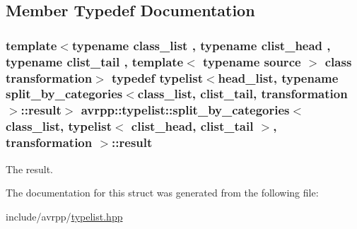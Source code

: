 \subsection{Member Typedef Documentation}
\hypertarget{structavrpp_1_1typelist_1_1split__by__categories_3_01class__list_00_01typelist_3_01clist__head_0fa46119bbacf04c898014ff4be749bde_a69ffa426e49eeba388aae05af3c33b9b}{
\subsubsection[{result}]{\setlength{\rightskip}{0pt plus 5cm}template$<$typename class\_\-list , typename clist\_\-head , typename clist\_\-tail , template$<$ typename source $>$ class transformation$>$ typedef {\bf typelist}$<$head\_\-list, typename split\_\-by\_\-categories$<$class\_\-list, clist\_\-tail, transformation$>$::{\bf result}$>$ avrpp::typelist::split\_\-by\_\-categories$<$ class\_\-list, {\bf typelist}$<$ clist\_\-head, clist\_\-tail $>$, transformation $>$::{\bf result}}}
\label{structavrpp_1_1typelist_1_1split__by__categories_3_01class__list_00_01typelist_3_01clist__head_0fa46119bbacf04c898014ff4be749bde_a69ffa426e49eeba388aae05af3c33b9b}


The result. 



The documentation for this struct was generated from the following file:\begin{DoxyCompactItemize}
\item 
include/avrpp/\hyperlink{typelist_8hpp}{typelist.hpp}\end{DoxyCompactItemize}
